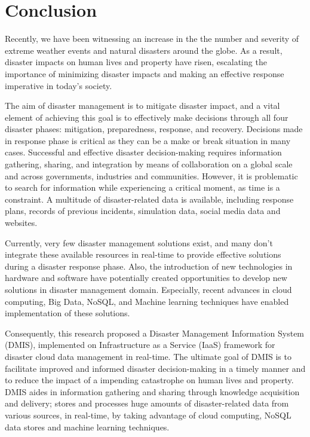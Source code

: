 \chapter{Conclusion}

Recently, we have been witnessing an increase in the the number and severity of extreme weather events and natural disasters around the globe. As a result, disaster impacts on human lives and property have risen, escalating the importance of minimizing disaster impacts and making an effective response imperative in today's society.

The aim of disaster management is to mitigate disaster impact, and a vital element of achieving this goal is to effectively make decisions through all four disaster phases: mitigation, preparedness, response, and recovery. Decisions made in response phase is critical as they can be a make or break situation in many cases. Successful and effective disaster decision-making requires information gathering, sharing, and integration by means of collaboration on a global scale and across governments, industries and communities. However, it is problematic to search for information while experiencing a critical moment, as time is a constraint. A multitude of disaster-related data is available, including response plans, records of previous incidents, simulation data, social media data and websites.

Currently, very few disaster management solutions exist, and many don't integrate these available resources in real-time to provide effective solutions during a disaster response phase. Also, the introduction of new technologies in hardware and software have potentially created opportunities to develop new solutions in disaster management domain. Especially, recent advances in cloud computing, Big Data, NoSQL, and Machine learning techniques have enabled implementation of these solutions.

Consequently, this research proposed a Disaster Management Information System (DMIS), implemented on Infrastructure as a Service (IaaS) framework for disaster cloud data management in real-time. The ultimate goal of DMIS is to facilitate improved and informed disaster decision-making in a timely manner and to reduce the impact of a impending catastrophe on human lives and property. DMIS aides in information gathering and sharing through knowledge acquisition and delivery; stores and processes huge amounts of disaster-related data from various sources, in real-time, by taking advantage of cloud computing, NoSQL data stores and machine learning techniques.

